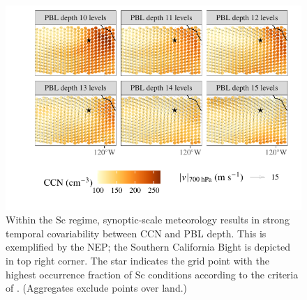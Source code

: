 \documentclass[acp, manuscript]{copernicus}\usepackage[]{graphicx}\usepackage[]{xcolor}
\newenvironment{knitrout}{}{} %
\newcommand{\jmu}{\ensuremath{j_\mu}}
\newcommand{\jmcomment}[1]{\todo[inline, color=red!50]{\jmu: #1}}
\begin{document}
\begin{figure}[t]
  \centering

\begin{knitrout}
\color{fgcolor}

{\centering \includegraphics[width=12cm]{figure/e3sm-ccn-met-plot-1} 

}


\end{knitrout}
  \caption{Within the Sc regime, synoptic-scale meteorology
    results in strong temporal covariability between CCN
    and PBL depth.   This is exemplified by the NEP;
    the Southern
    California Bight is depicted in top right corner.  The star indicates
    the grid point
    with the highest occurrence fraction of Sc
    conditions according to the criteria of \citet{Medeiros2011}. (Aggregates exclude points over land.)} 
  \label{fig:covariability}
\end{figure}
%
\clearpage
% 
\end{document}

